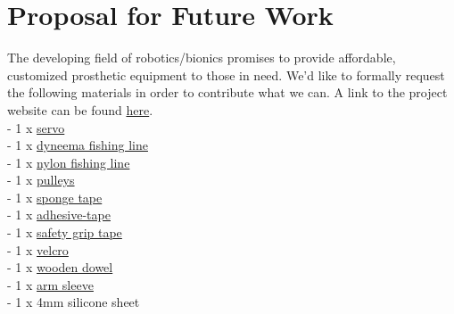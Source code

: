 \documentclass[twoside, 12pt]{article}
\theoremstyle{plain}
\begin{document}

\section{Proposal for Future Work}
The developing field of robotics/bionics promises to provide affordable, customized prosthetic equipment to those in need. We'd like to formally request the following materials in order to contribute what we can. A link to the project website can be found \href{https://hackaday.io/project/4745-openbionics-affordable-prosthetic-hands#menu-description}{here}.\\
- 1 x \href{http://www.dfrobot.com/index.php?route=product/product&product_id=964#.Vi075rfhDIU}{servo}\\
- 1  x \href{http://www.ebay.com/itm/Super-Strong-PE-Dyneema-Spectra-Extreme-Braid-Fishing-Line-300M-50LB-0-4mm-Green-/231522434670?hash=item35e7cffe6e:m:mS6JDkM3QDWhsCaMIFI_EGA}{dyneema fishing line}\\
- 1 x \href{http://www.amazon.com/gp/product/B00MUBWYL0?keywords=nylon%20fishing%20line%200.4&qid=1445805110&ref_=sr_1_6&sr=8-6}{nylon fishing line}\\
- 1 x \href{http://www.ebay.com/itm/20-PCS-3x12x4mm-1-2mm-Deep-V-Groove-Sealed-Guide-Pulley-Rail-Ball-Bearing-623VV-/171383515745}{pulleys}\\
- 1 x \href{http://www.amazon.com/Frost-King-R338H-Sponge-16-Inch/dp/B000BQWWF4/ref=sr_1_1?ie=UTF8&qid=1445803937&sr=8-1&keywords=sponge+tape+3%2F8+3%2F16}{sponge tape}\\
- 1 x \href{http://www.amazon.com/Scotch-23-Electrical-Width-Length/dp/B000V4P58M/ref=sr_1_1?ie=UTF8&qid=1445804020&sr=8-1&keywords=rubber+tape+scotch+23}{adhesive-tape}\\
- 1 x \href{http://www.vikingtapes.co.uk/p-1713-safety-grip-self-adhesive-tape-25mm-x-183m.aspx#.Vi085bfhDIV}{safety grip tape}\\
- 1 x \href{http://www.homedepot.com/p/VELCRO-brand-5-ft-x-3-4-in-Sticky-Back-Tape-90086/202261917}{velcro}\\
- 1 x \href{http://www.homedepot.com/p/Waddell-3-4-in-x-72-in-Hardwood-Round-Dowel-6440U/204397063}{wooden dowel}\\
- 1 x \href{http://www.amazon.com/gp/product/B008EQ1KJW?psc=1&redirect=true&ref_=oh_aui_detailpage_o00_s00}{arm sleeve}\\
- 1 x 4mm silicone sheet\\
\end{document}
